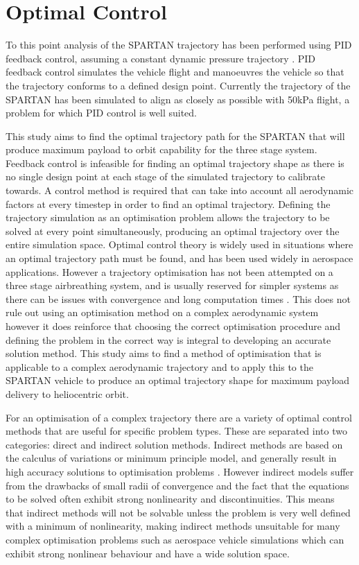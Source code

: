 \section{Optimal Control}


To this point analysis of the SPARTAN trajectory has been performed using PID feedback control, assuming a constant dynamic pressure trajectory \cite{Preller2015}. PID feedback control simulates the vehicle flight and manoeuvres the vehicle so that the trajectory conforms to a defined design point. Currently the trajectory of the SPARTAN has been simulated to align as closely as possible with 50kPa flight, a problem for which PID control is well suited. 

This study aims to find the optimal trajectory path for the SPARTAN that will produce maximum payload to orbit capability for the three stage system. Feedback control is infeasible for finding an optimal trajectory shape as there is no single design point at each stage of the simulated trajectory to calibrate towards. A control method is required that can take into account all aerodynamic factors at every timestep in order to find an optimal trajectory. Defining the trajectory simulation as an optimisation problem allows the trajectory to be solved at every point simultaneously, producing an optimal trajectory over the entire simulation space. Optimal control theory is widely used in situations where an optimal trajectory path must be found, and has been used widely in aerospace applications. However a trajectory optimisation has not been attempted on a three stage airbreathing system, and is usually reserved for simpler systems as there can be issues with convergence and long computation times \cite{Diehl2006}. This does not rule out using an optimisation method on a complex aerodynamic system however it does reinforce that choosing the correct optimisation procedure and defining the problem in the correct way is integral to developing an accurate solution method. This study aims to find a method of optimisation that is applicable to a complex aerodynamic trajectory and to apply this to the SPARTAN vehicle to produce an optimal trajectory shape for maximum payload delivery to heliocentric orbit.

For an optimisation of a complex trajectory there are a variety of optimal control methods that are useful for specific problem types. These are separated into two categories: direct and indirect solution methods. Indirect methods are based on the calculus of variations or minimum principle model, and generally result in high accuracy solutions to optimisation problems \cite{Bulirsch1993}. However indirect models suffer from the drawbacks of small radii of convergence and the fact that the equations to be solved often exhibit strong nonlinearity and discontinuities. This means that indirect methods will not be solvable unless the problem is very well defined with a minimum of nonlinearity, making indirect methods unsuitable for many complex optimisation problems such as aerospace vehicle simulations which can exhibit strong nonlinear behaviour and have a wide solution space. 

